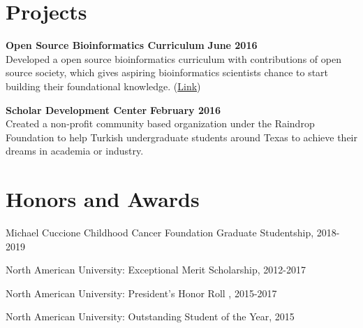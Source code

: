 \documentclass[margin,line]{res}
\begin{document}
\begin{resume}
%



\section{\sc Projects}


{\bf Open Source Bioinformatics Curriculum} \hfill {\bf June  2016}\\
Developed a open source bioinformatics curriculum with contributions of open source society, which gives aspiring bioinformatics scientists chance to start building their foundational knowledge. (\href{https://github.com/open-source-society/bioinformatics}{Link})

{\bf Scholar Development Center} \hfill {\bf February  2016}\\
Created a non-profit community based organization under the Raindrop Foundation to help Turkish undergraduate students around Texas to achieve their dreams in academia or industry.


\section{\sc Honors and Awards}

Michael Cuccione Childhood Cancer Foundation Graduate Studentship, 2018-2019

\vspace*{-2.5mm}
North American University: Exceptional Merit Scholarship, 2012-2017

\vspace*{-2.5mm}
North American University: President's Honor Roll , 2015-2017

\vspace*{-2.5mm}
North American University: Outstanding Student of the Year, 2015



\end{resume}
\end{document}
